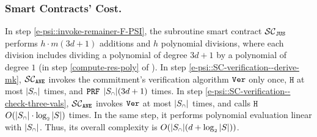 \vspace{-5mm}
 \subsubsection{Smart Contracts' Cost.}

In step \ref{e-psi::invoke-remainer-F-PSI}, the subroutine smart contract $\mathcal{SC}_{\mathtt{JUS}}$ performs $h\cdot m(3d+1)$ additions and $h$ polynomial divisions,  where each division includes dividing a polynomial of degree $3d+1$ by a polynomial of degree $1$ (in step \ref{compute-res-poly} of \fpsi). In step \ref{e-psi::SC-verification--derive-mk}, $\mathcal{SC}_{\mathtt{ANE}}$ invokes the commitment's verification algorithm $\mathtt{Ver}$ only once,  $\mathtt{H}$ at most $|S_{\scriptscriptstyle \cap}|$ times, and $\mathtt{PRF}$ $|S_{\scriptscriptstyle \cap}| (3d+1)$ times. In step \ref{e-psi::SC-verification--check-three-vals}, $\mathcal{SC}_{\mathtt{ANE}}$ invokes  $\mathtt{Ver}$ at most $|S_{\scriptscriptstyle \cap}|$ times, and calls $\mathtt{H}$ $O(|S_{\scriptscriptstyle \cap}|\cdot \log_{\scriptscriptstyle 2} |S|)$ times. In the same step, it  performs polynomial evaluation linear with  $|S_{\scriptscriptstyle \cap}|$. Thus, its overall complexity is $O( |S_{\scriptscriptstyle \cap}|(d+ \log_{\scriptscriptstyle 2} |S|))$.
%












%

  




